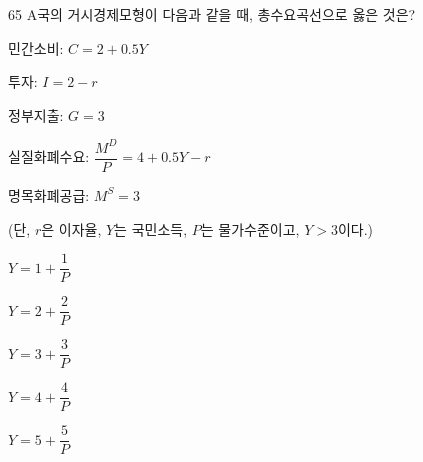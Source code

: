 \begin{question}{65}
A국의 거시경제모형이 다음과 같을 때, 총수요곡선으로 옳은 것은?
\begin{framedtext}
민간소비: $C = 2 + 0.5Y$ \par
투자: $I = 2 - r$ \par
정부지출: $G = 3$ \par
실질화폐수요: $\dfrac{M^D}{P} = 4 + 0.5Y - r$ \par
명목화폐공급: $M^S = 3$ \par
(단, $r$은 이자율, $Y$는 국민소득, $P$는 물가수준이고, $Y>3$이다.) \par
\end{framedtext}
\begin{choices}
  \item $Y = 1 + \dfrac{1}{P}$
  \item $Y = 2 + \dfrac{2}{P}$
  \item $Y = 3 + \dfrac{3}{P}$
  \item $Y = 4 + \dfrac{4}{P}$
  \item $Y = 5 + \dfrac{5}{P}$
\end{choices}
\end{question}
